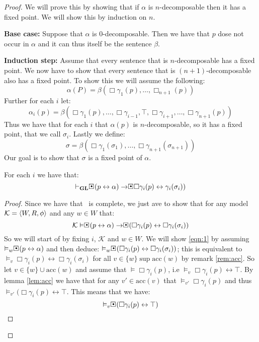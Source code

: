 \documentclass[../main.tex]{subfiles}
\begin{document}
\begin{proof}
	We will prove this by showing that if $\alpha$ is $n$-decomposable
	then it has a fixed point. We will show this by induction on $n$.

	\textbf{Base case:} Suppose that $\alpha$ is $0$-decomposable. Then we
	have that $p$ dose not occur in $\alpha$ and it can thus itself be the
	sentence $\beta$.

	\textbf{Induction step:}
	Assume that every sentence that is $n$-decomposable has a fixed point.
	We now have to show that every sentence that is $(n+1)$-decomposable
	also has a fixed point. To show this we will assume the following:
	$$\alpha(P)=\beta(\Box\gamma_1(p),\ldots,\Box_{n+1}(p))$$
	Further for each $i$ let:
	$$\alpha_i(p)=\beta(\Box\gamma_1(p),\ldots,\Box\gamma_{i-1},\top,\Box\gamma_{i+1},\ldots,\Box\gamma_{n+1}(p))$$
	Thus we have that for each $i$ that $\alpha(p)$ is $n$-decomposable,
	so it has a fixed point, that we call $\sigma_i$. Lastly we define:
	$$\sigma=\beta(\Box\gamma_1(\sigma_1),\ldots,\Box\gamma_{n+1}(\sigma_{n+1}))$$
	Our goal is to show that $\sigma$ is a fixed point of $\alpha$.
	\begin{lem}
		\label{lem:fix}
		For each $i$ we have that:
		$$\vdash_\GL\sBox(p\leftrightarrow\alpha)\rightarrow\sBox\Box\gamma_i(p)\leftrightarrow\gamma_i(\sigma_i))$$
	\end{lem}
	\begin{proof}
		Since we have that \GL\ is complete, we just ave to show that
		for any model $\mathcal{K}=\langle W,R,\phi\rangle$ and any $w\in W$
		that:
		\begin{equation}
		\label{eqn:1}
			\mathcal{K}\vDash\sBox(p\leftrightarrow\alpha)\rightarrow\sBox(\Box\gamma_i(p)\leftrightarrow
		\Box\gamma_i(\sigma_i))
	\end{equation}
		So we will start of by fixing $i$, $\mathcal{K}$ and $w\in W$.
		We will show \ref{eqn:1} by assuming
		$\vDash_w\sBox(p\leftrightarrow\alpha)$ and then deduce:
		$\vDash_w\sBox(\Box\gamma_i(p)\leftrightarrow\Box\gamma_i(\sigma_i))$;
		this is equivalent to $\vDash_v\Box
		\gamma_i(p)\leftrightarrow\Box\gamma_i(\sigma_i)$ for all
		$v\in\{w\}\sup\text{acc}(w)$ by remark \ref{rem:acc}. So let
		$v\in\{w\}\cup\text{acc}(w)$ and assume that
		$\vDash\Box\gamma_i(p)$, i.e
		$\vDash_v\Box\gamma_i(p)\leftrightarrow\top$. By lemma
		\ref{lem:acc} we have that for any $v'\in\text{acc}(v)$ that
		$\vDash_{v'}\Box\gamma_i(p)$ and thus
		$\vDash_{v'}(\Box\gamma_i(p)\leftrightarrow\top$. This means
		that we have:
		$$\vDash_v\sBox(\Box\gamma_i(p)\leftrightarrow\top)$$

\end{proof}
\end{proof}
\end{document}

